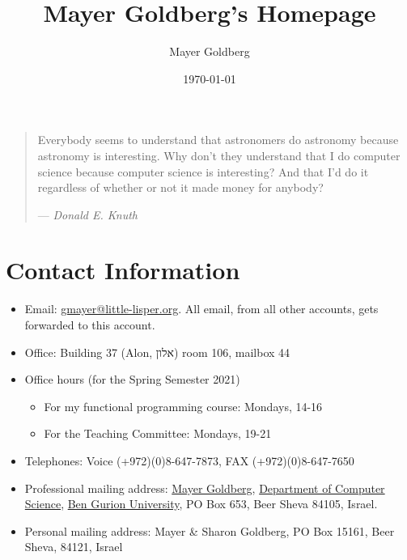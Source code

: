 \documentclass[11pt]{article}
\author{Mayer Goldberg}
\date{\today}
\title{Mayer Goldberg's Homepage}
\begin{document}
\maketitle
\tableofcontents

\begin{quote}
Everybody seems to understand that astronomers do astronomy because
astronomy is interesting. Why don't they understand that I do computer
science because computer science is interesting? And that I'd do it
regardless of whether or not it made money for anybody? 

--- \emph{Donald E. Knuth}
\end{quote}

\section{Contact Information}
\label{sec:org437284f}

\begin{itemize}
\item Email: \href{mailto:gmayer@little-lisper.org}{gmayer@little-lisper.org}. All email, from all other accounts,
gets forwarded to this account.
\item Office: Building 37 (Alon, אלון) room 106, mailbox 44
\item Office hours (for the Spring Semester 2021)
\begin{itemize}
\item For my functional programming course: Mondays, 14-16
\item For the Teaching Committee: Mondays, 19-21
\end{itemize}
\item Telephones: Voice (+972)(0)8-647-7873, FAX (+972)(0)8-647-7650
\item Professional mailing address: \href{mailto:gmayer@little-lisper.org}{Mayer Goldberg}, \href{http://www.cs.bgu.ac.il/}{Department of Computer
Science}, \href{http://www.bgu.ac.il/}{Ben Gurion University}, PO Box 653, Beer Sheva 84105,
Israel.
\item Personal mailing address: Mayer \& Sharon Goldberg, PO Box 15161,
Beer Sheva, 84121, Israel
\end{itemize}
\end{document}
